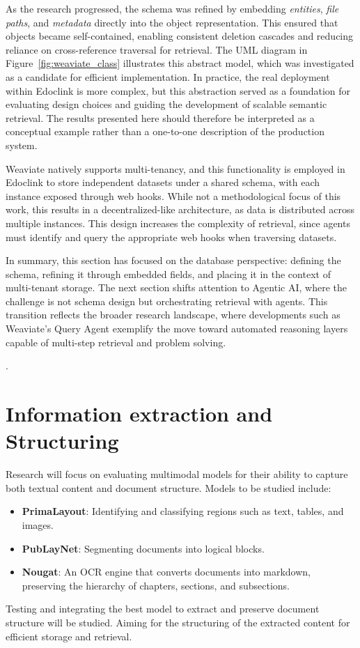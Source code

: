 As the research progressed, the schema was refined by embedding \textit{entities}, \textit{file paths}, and \textit{metadata} directly into the object representation. This ensured that objects became self-contained, enabling consistent deletion cascades and reducing reliance on cross-reference traversal for retrieval. The UML diagram in Figure~\ref{fig:weaviate_class} illustrates this abstract model, which was investigated as a candidate for efficient implementation. In practice, the real deployment within Edoclink is more complex, but this abstraction served as a foundation for evaluating design choices and guiding the development of scalable semantic retrieval. The results presented here should therefore be interpreted as a conceptual example rather than a one-to-one description of the production system.

Weaviate natively supports multi-tenancy, and this functionality is employed in Edoclink to store independent datasets under a shared schema, with each instance exposed through web hooks. While not a methodological focus of this work, this results in a decentralized-like architecture, as data is distributed across multiple instances. This design increases the complexity of retrieval, since agents must identify and query the appropriate web hooks when traversing datasets.  

In summary, this section has focused on the database perspective: defining the schema, refining it through embedded fields, and placing it in the context of multi-tenant storage. The next section shifts attention to Agentic AI, where the challenge is not schema design but orchestrating retrieval with agents. This transition reflects the broader research landscape, where developments such as Weaviate’s Query Agent \cite{weaviate} exemplify the move toward automated reasoning layers capable of multi-step retrieval and problem solving.

.


\section{Information extraction and Structuring}
Research will focus on evaluating multimodal models for their ability to capture both textual content and document structure. Models to be studied include:
\begin{itemize}
    \item \textbf{PrimaLayout}: Identifying and classifying regions such as text, tables, and images.
    \item \textbf{PubLayNet}: Segmenting documents into logical blocks.
    \item \textbf{Nougat}: An OCR engine that converts documents into markdown, preserving the hierarchy of chapters, sections, and subsections.
    
\end{itemize}
Testing and integrating the best model to extract and preserve document structure will be studied. Aiming for the structuring of the extracted content for efficient storage and retrieval.
